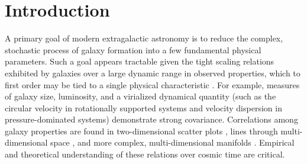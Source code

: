 \documentclass[apj,iop,numberedappendix]{emulateapj}
\begin{document}

\section{Introduction}
\label{sec:intro}

A primary goal of modern extragalactic astronomy is to reduce the complex,
stochastic process of galaxy formation into a few fundamental physical
parameters.  Such a goal appears tractable given the tight scaling relations
exhibited by galaxies over a large dynamic range in observed properties, which
to first order may be tied to a single physical characteristic
\citep{2008Natur.455.1082D}.  For example, measures of galaxy size, luminosity,
and a virialized dynamical quantity (such as the circular velocity in
rotationally supported systems and velocity dispersion in pressure-dominated
systems) demonstrate strong covariance.  Correlations among galaxy properties
are found in two-dimensional scatter plots \citep[e.g.,][]{2007ApJ...671..203C,
2010ApJ...715..606N, 2011ApJ...726...77S}, lines through multi-dimensional space
\citep[e.g.,][]{2011ApJ...726..108T}, and more complex, multi-dimensional
manifolds \citep[e.g.,][]{2008ApJ...682...68Z}.  Empirical and theoretical
understanding of these relations over cosmic time \citep[as in,
e.g.,][]{2011MNRAS.410.1660D} are critical.
\end{document}
